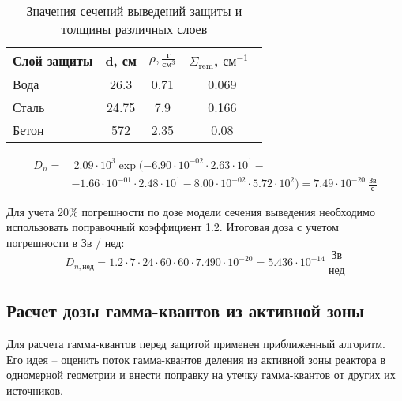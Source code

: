 \begin{table}[H]
	\caption{Значения сечений выведений защиты и толщины различных слоев \cite{ТвэлТерновых}}
	\begin{center}
        \begin{tabular}{|l|c|c|c|}
        \toprule
         Слой защиты & d, см & $\rho, \frac{\text{г}}{\text{см}^3}$ & $\Sigma_{\text{rem}}$, $\text{см}^{-1}$\ \\
         \midrule
         \hline
         Вода & 26.3 & 0.71 & 0.069 \\
         \hline
         Сталь & 24.75 & 7.9 & 0.166 \\
         \hline
         Бетон & 572 & 2.35 & 0.08 \\
         \bottomrule
		\end{tabular}
		\label{tabular:bio_sec_2_in}
	\end{center}
\end{table}
\begin{align*}
        D_n =&\ 2.09 \cdot 10^{{ 3 }} \exp( 
                -6.90 \cdot 10^{{ -02 }}\cdot2.63 \cdot 10^{{ 1 }} -
                \\ &-1.66 \cdot 10^{{ -01 }}\cdot2.48 \cdot 10^{{ 1 }}
                -8.00 \cdot 10^{{ -02 }}\cdot5.72 \cdot 10^{{ 2 }}
        ) = 7.49 \cdot 10^{{ -20 }}\ \frac{\text{Зв}}{\text{с}}
\end{align*}

\noindent Для учета 20\% погрешности по дозе модели сечения выведения необходимо использовать поправочный коэффициент 1.2. Итоговая доза с учетом погрешности в Зв / нед:
\begin{equation*}
        D_{n, \text{нед}} = 1.2 \cdot 7 \cdot 24 \cdot 60 \cdot 60 \cdot 7.490 \cdot 10^{{ -20 }} = 5.436 \cdot 10^{{ -14 }}\ \frac{\text{Зв}}{\text{нед}}
\end{equation*}

\iffalse
\subsection{Расчет дозы гамма-квантов из активной зоны}
Для расчета гамма-квантов перед защитой применен приближенный алгоритм. Его идея – оценить поток гамма-квантов деления из активной зоны реактора в одномерной геометрии и внести поправку на утечку гамма-квантов от других их источников.

